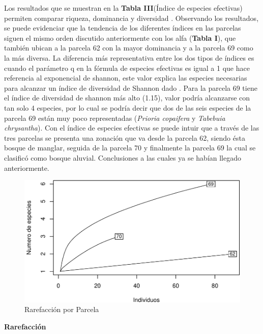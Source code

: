 \documentclass[conference,final,12pt,]{IEEEtran}
\makeatletter
\def\maxwidth{\ifdim\Gin@nat@width>\linewidth\linewidth
\else\Gin@nat@width\fi}
\let\Oldincludegraphics\includegraphics
\renewcommand{\includegraphics}[1]{\Oldincludegraphics[width=\maxwidth]{#1}}
\makeatother
\begin{document}
Los resultados que se muestran en la \textbf{Tabla III}(Índice de
especies efectivas) permiten comparar riqueza, dominancia y diversidad
\citep{V}. Observando los resultados, se puede evidenciar que la
tendencia de los diferentes índices en las parcelas siguen el mismo
orden discutido anteriormente con los alfa (\textbf{Tabla I}), que
también ubican a la parcela 62 con la mayor dominancia y a la parcela 69
como la más diversa. La diferencia más representativa entre los dos
tipos de índices es cuando el parámetro q en la fórmula de especies
efectivas es igual a 1 que hace referencia al exponencial de shannon,
este valor explica las especies necesarias para alcanzar un índice de
diversidad de Shannon dado \citep{B}. Para la parcela 69 tiene el índice
de diversidad de shannon más alto (1.15), valor podría alcanzarse con
tan solo 4 especies, por lo cual se podría decir que dos de las seis
especies de la parcela 69 están muy poco representadas (\emph{Prioria
copaifera} y \emph{Tabebuia chrysantha}). Con el índice de especies
efectivas se puede intuir que a través de las tres parcelas se presenta
una zonación que va desde la parcela 62, siendo ésta bosque de manglar,
seguida de la parcela 70 y finalmente la parcela 69 la cual se clasificó
como bosque aluvial. Conclusiones a las cuales ya se habían llegado
anteriormente.

\begin{figure}[htb]
\centering
\includegraphics{mangrove_files/figure-latex/unnamed-chunk-5-1.pdf}
\caption{Rarefacción por Parcela}
\end{figure}

\textbf{Rarefacción} 
\end{document}
